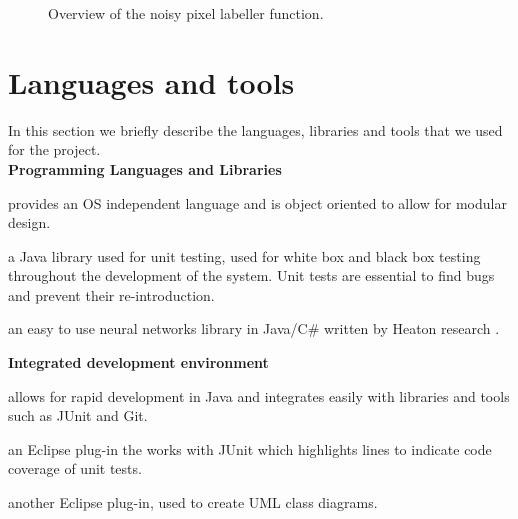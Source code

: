 \documentclass[12pt,twoside,notitlepage]{report}
\begin{document}
\begin{figure}[H]
{\begin{tikzpicture}[node distance=2cm,>=stealth',bend angle=45,auto]
                                    
                            \end{tikzpicture}
                        }

                    \caption{Overview of the noisy pixel labeller function.}
                \end{figure} 







    \section{Languages and tools}
        In this section we briefly describe the languages, libraries and tools that we used for the project. \\

        \noindent\textbf{Programming Languages and Libraries}
            \begin{description}[font=\normalfont\itshape, labelindent=10pt]
                \item[Java:] provides an OS independent language and is object oriented to allow for modular design.
                \item[JUnit:] a Java library used for unit testing, used for white box and black box testing throughout 
                    the development of the system. Unit tests are essential to find bugs and prevent their re-introduction.
                \item[Encog:] an easy to use neural networks library in Java/C\# written by Heaton research \cite{JMLR:v16:heaton15a}. 
            \end{description}

        \noindent\textbf{Integrated development environment}
            \begin{description}[font=\normalfont\itshape, labelindent=10pt]
                \item[Eclipse:] allows for rapid development in Java and integrates easily with libraries and tools such 
                    as JUnit and Git.
                \item[EclEmma:] an Eclipse plug-in the works with JUnit which highlights lines to indicate code coverage 
                    of unit tests.
                \item[ObjectAid:] another Eclipse plug-in, used to create UML class diagrams.
            \end{description}
\end{document}
